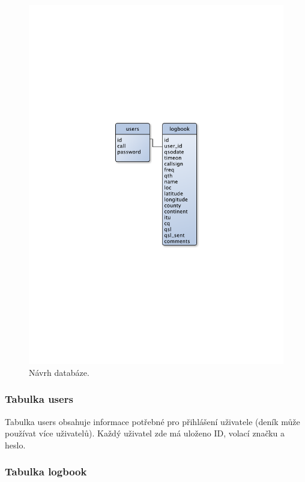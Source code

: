 \begin{figure}[h]
\centering
\includegraphics[trim=9cm 9cm 9cm 9cm, scale=0.7]{fig/navrh_databaze}
\caption{Návrh databáze.}
\label{fig:FigureExample}
\end{figure}

\subsubsection{Tabulka users}

Tabulka users obsahuje informace potřebné pro přihlášení uživatele (deník může
používat více uživatelů). Každý uživatel zde má uloženo ID, volací značku a
heslo.

\subsubsection{Tabulka logbook}

